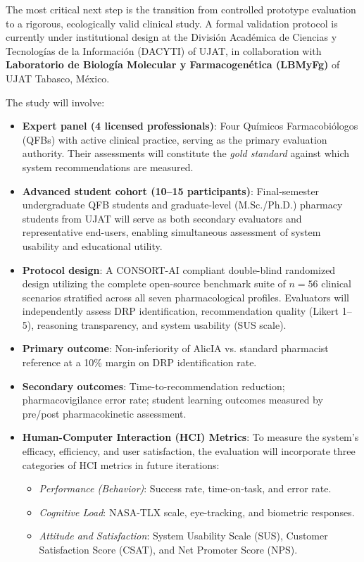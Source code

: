 \documentclass[9pt,conference]{IEEEtran}
\begin{document}
The most critical next step is the transition from controlled prototype evaluation
to a rigorous, ecologically valid clinical study. A formal validation protocol is
currently under institutional design at the
Divisi\'{o}n Acad\'{e}mica de Ciencias y Tecnolog\'{i}as de la Informaci\'{o}n
(DACYTI) of UJAT, in collaboration with \textbf{Laboratorio de Biolog\'{i}a Molecular y Farmacogen\'{e}tica (LBMyFg)} of UJAT Tabasco, M\'{e}xico.

The study will involve:

\begin{itemize}
  \item \textbf{Expert panel (4 licensed professionals)}: Four Qu\'{i}micos
    Farmacobi\'{o}logos (QFBs) with active clinical practice, serving as the
    primary evaluation authority. Their assessments will constitute the
    \textit{gold standard} against which system recommendations are measured.
  \item \textbf{Advanced student cohort (10--15 participants)}: Final-semester
    undergraduate QFB students and graduate-level (M.Sc./Ph.D.) pharmacy
    students from UJAT will serve as both secondary evaluators and representative
    end-users, enabling simultaneous assessment of system usability and
    educational utility.
  \item \textbf{Protocol design}: A CONSORT-AI compliant double-blind
    randomized design utilizing the complete open-source benchmark suite of 
    $n = 56$ clinical scenarios stratified across all seven pharmacological 
    profiles. Evaluators will independently assess DRP identification, 
    recommendation quality (Likert 1--5), reasoning transparency, and system 
    usability (SUS scale).
  \item \textbf{Primary outcome}: Non-inferiority of AlicIA vs. standard
    pharmacist reference at a 10\% margin on DRP identification rate.
  \item \textbf{Secondary outcomes}: Time-to-recommendation reduction;
    pharmacovigilance error rate; student learning outcomes measured by
    pre/post pharmacokinetic assessment.
  \item \textbf{Human-Computer Interaction (HCI) Metrics}: To measure the system's efficacy, efficiency, and user satisfaction, the evaluation will incorporate three categories of HCI metrics in future iterations:
    \begin{itemize}
      \item \textit{Performance (Behavior)}: Success rate, time-on-task, and error rate.
      \item \textit{Cognitive Load}: NASA-TLX scale, eye-tracking, and biometric responses.
      \item \textit{Attitude and Satisfaction}: System Usability Scale (SUS), Customer Satisfaction Score (CSAT), and Net Promoter Score (NPS).
    \end{itemize}
\end{itemize}
\end{document}
